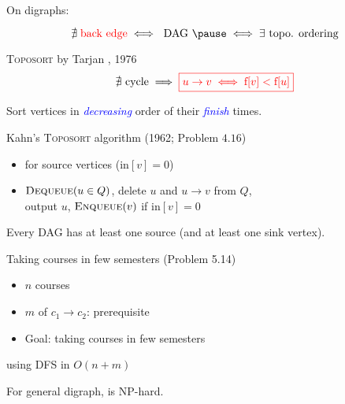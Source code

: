 
\begin{frame}{}
  \centerline{\large On digraphs:}
  \[
    \nexists\; \text{\red{back edge}} \iff \text{ DAG } \pause \iff \exists \text{ topo. ordering}
  \]

  \pause
  \begin{block}{\textsc{Toposort} by Tarjan , 1976}
    \vspace{0.30cm}
    \[
      \nexists \text{ cycle} \implies \textcolor{red}{\boxed{u \to v \iff \text{f}[v] < \text{f}[u]}}
    \]

    \pause
    \vspace{0.50cm}
    \centerline{Sort vertices in \textcolor{blue}{\emph{decreasing}} order of their \textcolor{blue}{\emph{finish}} times.}
  \end{block}
\end{frame}
\begin{frame}{}
  \begin{exampleblock}{Kahn's \textsc{Toposort} algorithm (1962; Problem $4.16$) }
    \begin{itemize}
      \item {} for source vertices ($\text{in}[v] = 0$)
      \item {} $\textsc{Dequeue}(u \in Q)$, delete $u$ and $u \to v$ from $Q$, \\
	\hspace{1.5cm} output $u$, $\textsc{Enqueue}(v)$ if $\text{in}[v] = 0$
    \end{itemize}
  \end{exampleblock}

  \pause
  \vspace{0.60cm}
  \begin{lemma}
    Every DAG has at least one source (and at least one sink vertex).
  \end{lemma}

  \pause
  \vspace{0.80cm}
  \centerline{}
\end{frame}
\begin{frame}{}
  \begin{exampleblock}{Taking courses in few semesters (Problem 5.14)}
    \begin{itemize}
      \item $n$ courses
      \item $m$ of $c_1 \to c_2$: prerequisite
      \item Goal: taking courses in few semesters
    \end{itemize}
  \end{exampleblock}

  \pause
  \vspace{0.60cm}
  \centerline{ using DFS in $O(n + m)$}

  \pause
  \vspace{0.80cm}
  \centerline{For general digraph,  is NP-hard.}
\end{frame}

